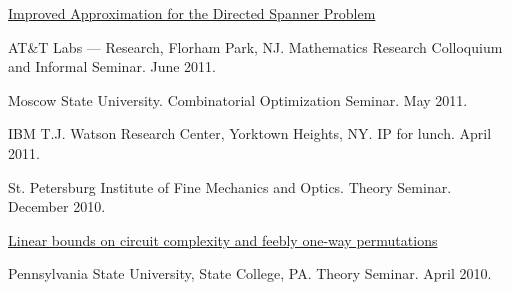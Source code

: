 \documentclass[11pt]{article}
\newenvironment{innerlist}[1][\enskip\textbullet]%
        {\begin{compactitem}[#1]}{\end{compactitem}}
\newcommand{\blankline}{\quad\pagebreak[2]}
\begin{document}
\begin{innerlist}
\begin{comment}
\item \href{http://grigory.us/talsk/DPIntro.pptx}{Introduction to Differential Privacy} (based on slides by Adam D. Smith).
\begin{innerlist}
\item St. Petersburg Department of Steklov Institute of Mathematics, Computer Science Club, May 2011.
\end{innerlist}

\item Property Testing and Communication Complexity
\begin{innerlist}
\item Moscow State University. Kolmogorov Seminar. May 2011.
\end{innerlist}
\end{comment}

\item \href{http://grigory.us/files/talks/20110704_Directed_Spanners_ICALP11.pptx}{Improved Approximation for the Directed Spanner Problem}
\begin{innerlist}
  \item AT\&T Labs --- Research, Florham Park, NJ. Mathematics Research Colloquium and Informal Seminar. June 2011.
  \item Moscow State University. Combinatorial Optimization Seminar. May 2011.
  \item IBM T.J. Watson Research Center, Yorktown Heights, NY. IP for lunch. April 2011.
  \item St. Petersburg Institute of Fine Mechanics and Optics. Theory Seminar. December 2010.
\end{innerlist}
\item \href{http://grigory.us/files/talks/penn10.pdf}{Linear bounds on circuit complexity and feebly one-way permutations}
    \begin{innerlist}
      \item Pennsylvania State University, State College, PA. Theory Seminar. April 2010.
    \end{innerlist}
\end{innerlist}
\blankline
\end{document}
